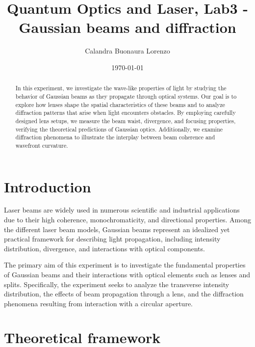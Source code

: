 \documentclass[prl,twocolumn]{revtex4-1}
\begin{document}
\title{Quantum Optics and Laser, Lab3 - Gaussian beams and diffraction}



\author{Calandra Buonaura Lorenzo}

\date{\today}


\begin{abstract}

In this experiment, we investigate the wave-like properties of light by studying the behavior of Gaussian beams as they propagate through optical systems. Our goal is to explore how lenses shape the spatial characteristics of these beams and to analyze diffraction patterns that arise when light encounters obstacles. By employing carefully designed lens setups, we measure the beam waist, divergence, and focusing properties, verifying the theoretical predictions of Gaussian optics. Additionally, we examine diffraction phenomena to illustrate the interplay between beam coherence and wavefront curvature.

\end{abstract}

\maketitle

\section{Introduction}

Laser beams are widely used in numerous scientific and industrial applications due to their high coherence, monochromaticity, and directional properties. Among the different laser beam models, Gaussian beams represent an idealized yet practical framework for describing light propagation, including intensity distribution, divergence, and interactions with optical components. 

The primary aim of this experiment is to investigate the fundamental properties of Gaussian beams and their interactions with optical elements such as lenses and splits. Specifically, the experiment seeks to analyze the transverse intensity distribution, the effects of beam propagation through a lens, and the diffraction phenomena resulting from interaction with a circular aperture.


\section{Theoretical framework}
\end{document}
